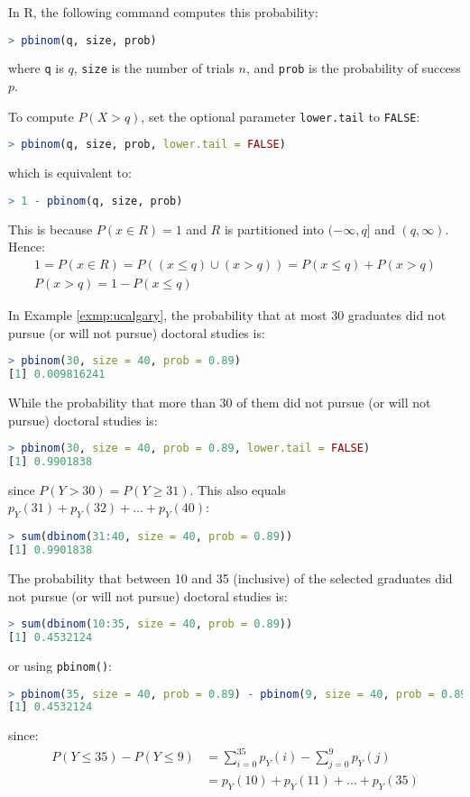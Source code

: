 In R, the following command computes this probability:
\begin{lstlisting}[language=R]
> pbinom(q, size, prob)
\end{lstlisting}
where \verb|q| is \( q \), \verb|size| is the number of trials \( n \), and \verb|prob| is the probability of success \( p \).

To compute \( P(X > q) \), set the optional parameter \verb|lower.tail| to \verb|FALSE|:
\begin{lstlisting}[language=R]
> pbinom(q, size, prob, lower.tail = FALSE)
\end{lstlisting}
which is equivalent to:
\begin{lstlisting}[language=R]
> 1 - pbinom(q, size, prob)
\end{lstlisting}
This is because \( P(x \in R) = 1 \) and \( R \) is partitioned into \( (-\infty, q] \) and \( (q, \infty) \).
Hence:
\begin{gather*}
    1 = P(x \in R) = P((x \leq q) \cup (x > q)) = P(x \leq q) + P(x > q)\\
    P(x > q) = 1 - P(x \leq q)
\end{gather*}
\begin{exmp}
    In Example \autoref{exmp:ucalgary}, the probability that at most 30 graduates did not pursue (or will not pursue) doctoral studies is:
    \begin{lstlisting}[language=R]
> pbinom(30, size = 40, prob = 0.89)
[1] 0.009816241
    \end{lstlisting}
    While the probability that more than 30 of them did not pursue (or will not pursue) doctoral studies is:
    \begin{lstlisting}[language=R]
> pbinom(30, size = 40, prob = 0.89, lower.tail = FALSE)
[1] 0.9901838
    \end{lstlisting}
    since \( P(Y > 30) = P(Y \geq 31) \).
    This also equals \( p_{Y}(31) + p_{Y}(32) + \ldots + p_{Y}(40) \):
    \begin{lstlisting}[language=R]
> sum(dbinom(31:40, size = 40, prob = 0.89))
[1] 0.9901838
    \end{lstlisting}
    The probability that between 10 and 35 (inclusive) of the selected graduates did not pursue (or will not pursue) doctoral studies is:
    \begin{lstlisting}[language=R]
> sum(dbinom(10:35, size = 40, prob = 0.89))
[1] 0.4532124
    \end{lstlisting}
    or using \verb|pbinom()|:
    \begin{lstlisting}[language=R]
> pbinom(35, size = 40, prob = 0.89) - pbinom(9, size = 40, prob = 0.89)
[1] 0.4532124
    \end{lstlisting}
    since:
    \begin{align*}
        P(Y \leq 35) - P(Y \leq 9) &= \sum_{i = 0}^{35} p_{Y}(i) - \sum_{j = 0}^{9} p_{Y}(j)\\
        &= p_{Y}(10) + p_{Y}(11) + \ldots + p_{Y}(35)
    \end{align*}
\end{exmp}

